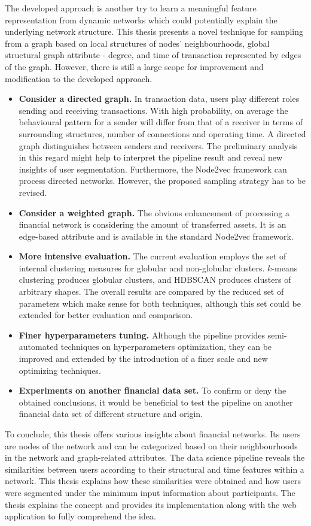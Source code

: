 The developed approach is another try to learn a meaningful feature representation from dynamic networks which could potentially explain the underlying network structure. This thesis presents a novel technique for sampling from a graph based on local structures of nodes' neighbourhoods, global structural graph attribute - degree, and time of transaction represented by edges of the graph. However, there is still a large scope for improvement and modification to the developed approach.
\begin{itemize}
    \item \textbf{Consider a directed graph. }In transaction data, users play different roles sending and receiving transactions. With high probability, on average the behavioural pattern for a sender will differ from that of a receiver in terms of surrounding structures, number of connections and operating time. A directed graph distinguishes between senders and receivers. The preliminary analysis in this regard might help to interpret the pipeline result and reveal new insights of user segmentation. Furthermore, the Node2vec framework can process directed networks. However, the proposed sampling strategy has to be revised.
    \item \textbf{Consider a weighted graph. }The obvious enhancement of processing a financial network is considering the amount of transferred assets. It is an edge-based attribute and is available in the standard Node2vec framework.
    \item \textbf{More intensive evaluation. }The current evaluation employs the set of internal clustering measures for globular and non-globular clusters. $k$-means clustering produces globular clusters, and HDBSCAN produces clusters of arbitrary shapes. The overall results are compared by the reduced set of parameters which make sense for both techniques, although this set could be extended for better evaluation and comparison.
    \item \textbf{Finer hyperparameters tuning. }Although the pipeline provides semi-automated techniques on hyperparameters optimization, they can be improved and extended by the introduction of a finer scale and new optimizing techniques.
    \item \textbf{Experiments on another financial data set. }To confirm or deny the obtained conclusions, it would be beneficial to test the pipeline on another financial data set of different structure and origin.
\end{itemize}
To conclude, this thesis offers various insights about financial networks. Its users are nodes of the network and can be categorized based on their neighbourhoods in the network and graph-related attributes. The data science pipeline reveals the similarities between users according to their structural and time features within a network. This thesis explains how these similarities were obtained and how users were segmented under the minimum input information about participants. The thesis explains the concept and provides its implementation along with the web application to fully comprehend the idea.
